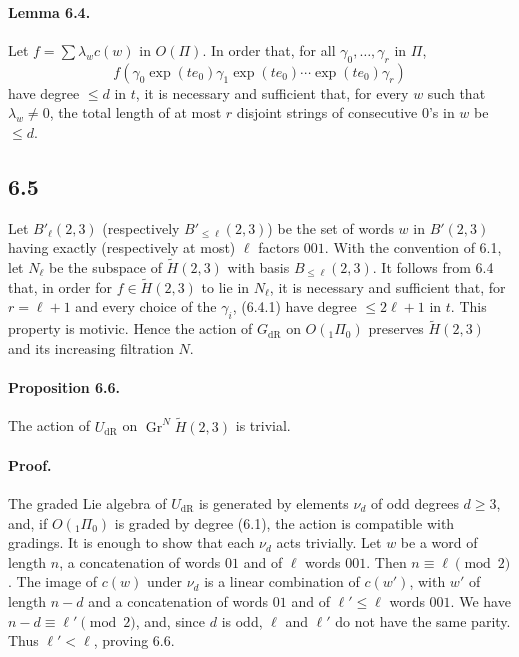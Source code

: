 \documentclass[10pt]{article}
\newcommand{\dR}{\mathrm{dR}}
\begin{document}
\paragraph{Lemma 6.4.}
Let $f=\sum\lambda_w c(w)$ in $O(\Pi)$. In order that, for all $\gamma_0,\ldots,\gamma_r$ in $\Pi$,
\begin{equation}
f(\gamma_0\exp(te_0)\gamma_1\exp(te_0)\cdots\exp(te_0)\gamma_r)
\tag{6.4.1}
\end{equation}
have degree $\leq d$ in $t$, it is necessary and sufficient that, for every $w$ such that $\lambda_w\ne0$, the total length of at most $r$ disjoint strings of consecutive $0$'s in $w$ be $\leq d$.

\subsection*{6.5}
Let $B'_{\ell}(2,3)$ (respectively $B'_{\leq\ell}(2,3)$) be the set of words $w$ in $B'(2,3)$ having exactly (respectively at most) $\ell$ factors $001$. With the convention of 6.1, let $N_{\ell}$ be the subspace of $\widetilde H(2,3)$ with basis $B_{\leq\ell}(2,3)$. It follows from 6.4 that, in order for $f\in\widetilde H(2,3)$ to lie in $N_{\ell}$, it is necessary and sufficient that, for $r=\ell+1$ and every choice of the $\gamma_i$, (6.4.1) have degree $\leq2\ell+1$ in $t$. This property is motivic. Hence the action of $G_{\dR}$ on $O({}_1\Pi_0)$ preserves $\widetilde H(2,3)$ and its increasing filtration $N$.

\paragraph{Proposition 6.6.}
The action of $U_{\dR}$ on $\operatorname{Gr}^N\widetilde H(2,3)$ is trivial.

\paragraph{Proof.}
The graded Lie algebra of $U_{\dR}$ is generated by elements $\nu_d$ of odd degrees $d\geq3$, and, if $O({}_1\Pi_0)$ is graded by degree (6.1), the action is compatible with gradings. It is enough to show that each $\nu_d$ acts trivially. Let $w$ be a word of length $n$, a concatenation of words $01$ and of $\ell$ words $001$. Then $n\equiv\ell\pmod2$. The image of $c(w)$ under $\nu_d$ is a linear combination of $c(w')$, with $w'$ of length $n-d$ and a concatenation of words $01$ and of $\ell'\leq\ell$ words $001$. We have $n-d\equiv\ell'\pmod2$, and, since $d$ is odd, $\ell$ and $\ell'$ do not have the same parity. Thus $\ell'<\ell$, proving 6.6.
\end{document}
